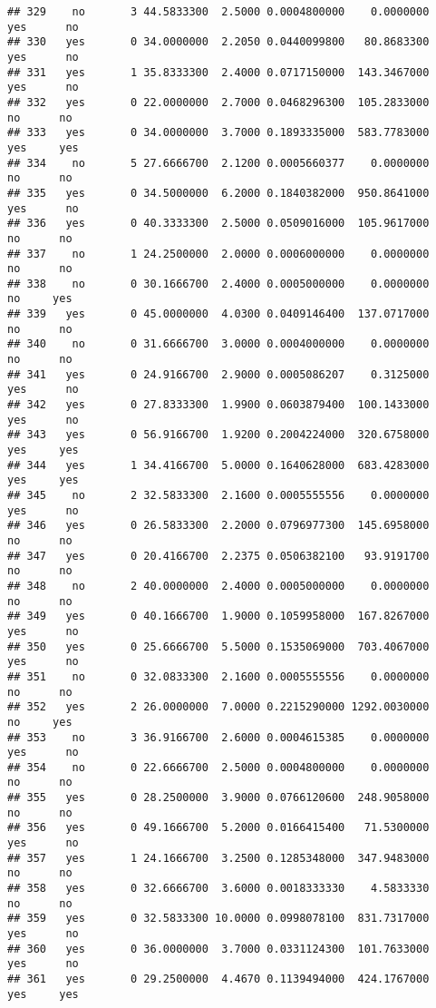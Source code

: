 \documentclass[]{article}
\begin{document}
\begin{verbatim}
## 329    no       3 44.5833300  2.5000 0.0004800000    0.0000000   yes      no
## 330   yes       0 34.0000000  2.2050 0.0440099800   80.8683300   yes      no
## 331   yes       1 35.8333300  2.4000 0.0717150000  143.3467000   yes      no
## 332   yes       0 22.0000000  2.7000 0.0468296300  105.2833000    no      no
## 333   yes       0 34.0000000  3.7000 0.1893335000  583.7783000   yes     yes
## 334    no       5 27.6666700  2.1200 0.0005660377    0.0000000    no      no
## 335   yes       0 34.5000000  6.2000 0.1840382000  950.8641000   yes      no
## 336   yes       0 40.3333300  2.5000 0.0509016000  105.9617000    no      no
## 337    no       1 24.2500000  2.0000 0.0006000000    0.0000000    no      no
## 338    no       0 30.1666700  2.4000 0.0005000000    0.0000000    no     yes
## 339   yes       0 45.0000000  4.0300 0.0409146400  137.0717000    no      no
## 340    no       0 31.6666700  3.0000 0.0004000000    0.0000000    no      no
## 341   yes       0 24.9166700  2.9000 0.0005086207    0.3125000   yes      no
## 342   yes       0 27.8333300  1.9900 0.0603879400  100.1433000   yes      no
## 343   yes       0 56.9166700  1.9200 0.2004224000  320.6758000   yes     yes
## 344   yes       1 34.4166700  5.0000 0.1640628000  683.4283000   yes     yes
## 345    no       2 32.5833300  2.1600 0.0005555556    0.0000000   yes      no
## 346   yes       0 26.5833300  2.2000 0.0796977300  145.6958000    no      no
## 347   yes       0 20.4166700  2.2375 0.0506382100   93.9191700    no      no
## 348    no       2 40.0000000  2.4000 0.0005000000    0.0000000    no      no
## 349   yes       0 40.1666700  1.9000 0.1059958000  167.8267000   yes      no
## 350   yes       0 25.6666700  5.5000 0.1535069000  703.4067000   yes      no
## 351    no       0 32.0833300  2.1600 0.0005555556    0.0000000    no      no
## 352   yes       2 26.0000000  7.0000 0.2215290000 1292.0030000    no     yes
## 353    no       3 36.9166700  2.6000 0.0004615385    0.0000000   yes      no
## 354    no       0 22.6666700  2.5000 0.0004800000    0.0000000    no      no
## 355   yes       0 28.2500000  3.9000 0.0766120600  248.9058000    no      no
## 356   yes       0 49.1666700  5.2000 0.0166415400   71.5300000   yes      no
## 357   yes       1 24.1666700  3.2500 0.1285348000  347.9483000    no      no
## 358   yes       0 32.6666700  3.6000 0.0018333330    4.5833330    no      no
## 359   yes       0 32.5833300 10.0000 0.0998078100  831.7317000   yes      no
## 360   yes       0 36.0000000  3.7000 0.0331124300  101.7633000   yes      no
## 361   yes       0 29.2500000  4.4670 0.1139494000  424.1767000   yes     yes

\end{verbatim}
\end{document}

